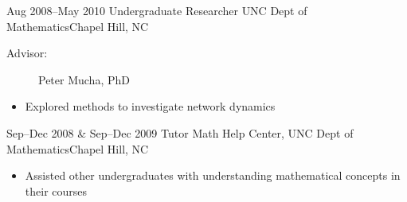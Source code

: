 \documentclass[11pt,a4paper,sans]{moderncv} %
\begin{document}
        \cventry
            {Aug 2008--May 2010}
            {Undergraduate Researcher}
            {UNC Dept of Mathematics}{Chapel Hill, NC}{}
            {
                \begin{description}
                    \item[Advisor:] Peter Mucha, PhD
                \end{description}
                \begin{itemize}
                    \item Explored methods to investigate network dynamics
                \end{itemize}
            }
        \cventry
            {Sep--Dec 2008 \& Sep--Dec 2009}
            {Tutor}
            {Math Help Center, UNC Dept of Mathematics}{Chapel Hill, NC}{}
            {
                \begin{itemize}
                    \item Assisted other undergraduates with understanding mathematical concepts in their courses
                \end{itemize}
            }

    \bigskip
\end{document}
